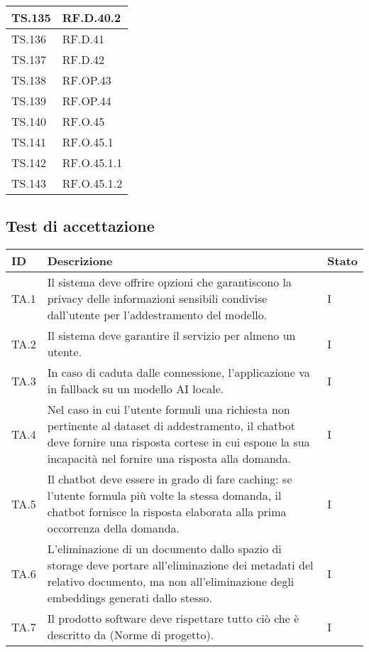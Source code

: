 {{{{{{{{{{\begin{tabularx}{\textwidth}{p{}|X}
    \hline
    TS.135 & RF.D.40.2 \\
    \hline
    TS.136 & RF.D.41 \\
    \hline
    TS.137 & RF.D.42 \\
    \hline
    TS.138 & RF.OP.43 \\
    \hline
    TS.139 & RF.OP.44 \\
    \hline
    TS.140 & RF.O.45 \\
    \hline
    TS.141 & RF.O.45.1 \\
    \hline
    TS.142 & RF.O.45.1.1 \\
    \hline
    TS.143 & RF.O.45.1.2 \\
    \end{tabularx}
    }


\subsection{Test di accettazione}
    {\renewcommand{\arraystretch}{1.5}
    \begin{tabularx}{\textwidth}{p{}|p{}|X}
    \textbf{ID} & \textbf{Descrizione} & \textbf{Stato}  \\
    \hline
    TA.1 & Il sistema deve offrire opzioni che garantiscono la privacy delle informazioni sensibili condivise dall’utente per l’addestramento del modello. & I \\
    \hline
    TA.2 & Il sistema deve garantire il servizio per almeno un utente. & I \\
    \hline
    TA.3 & In caso di caduta dalle connessione, l’applicazione va in fallback su un modello AI locale. & I \\
    \hline
    TA.4 & Nel caso in cui l’utente formuli una richiesta non pertinente al dataset di addestramento, il chatbot deve fornire una risposta cortese in cui espone la sua incapacità nel fornire una risposta alla domanda. & I \\
    \hline
    TA.5 & Il chatbot deve essere in grado di fare caching: se l’utente formula più volte la stessa domanda, il chatbot fornisce la risposta elaborata alla prima occorrenza della domanda. & I \\
    \hline
    TA.6 & L’eliminazione di un documento dallo spazio di storage deve portare all’eliminazione dei metadati del relativo documento, ma non all’eliminazione degli embeddings generati dallo stesso. & I \\
    \hline
    TA.7 & Il prodotto software deve rispettare tutto ciò che è descritto da (Norme di progetto). & I \\

\end{tabularx}}}}}}}}}}}
